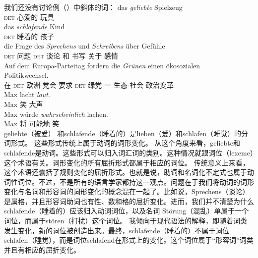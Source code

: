 我们还没有讨论例（）中斜体的词：
\eal
\ex 
\gll das \emph{geliebte} Spielzeug\\
	 \textsc{det} 心爱的 玩具\\
\ex 
\gll das \emph{schlafende} Kind\\
	 \textsc{det} 睡着的 孩子\\
\ex 
\gll die Frage des \emph{Sprechens} und \emph{Schreibens} über Gefühle\\
	 \textsc{det} 问题 \textsc{det} 谈论 和 书写 关于 感情\\
\ex 
\gll Auf dem Europa-Parteitag fordern die \emph{Grünen} einen ökosozialen~~~~~~~~~~~~ Politikwechsel.\\
	 在 \textsc{det} 欧洲-党会 要求 \textsc{det} 绿党 一 生态-社会 政治变革\\
\ex\label{Wortart-adverbiales-Adjektiv} 
\gll Max lacht \emph{laut}.\\
	 Max 笑 大声\\
\ex\label{Wortart-Satzadverb-Adjektiv} 
\gll Max würde \emph{wahrscheinlich} lachen.\\
     Max  将 可能地 笑\\
\zl
geliebte（被爱） 和schlafende（睡着的）是lieben（爱）和schlafen（睡觉）的分词形式。
这些形式传统上属于动词的词形变化。
从这个角度来看，geliebte和schlafende是动词。这些形式可以归入词汇词的类别。这种情况就跟词位（lexeme）这个术语有关。词形变化的所有屈折形式都属于相应的词位。
传统意义上来看，这个术语还囊括了规则变化的屈折形式。也就是说，助词和名词化不定式也属于动词性词位。不过，不是所有的语言学家都持这一观点。问题在于我们将动词的词形变化与名词和形容词的词形变化的概念混在一起了。比如说，Sprechens（谈论）是属格，并且形容词助词也有性、数和格的屈折变化。进而，我们并不清楚为什么schlafende（睡着的）应该归入动词词位，以及名词 Störung（混乱）单属于一个词位，而属于stören（打扰）这个词位。
我倾向于现代语法的解释，即随着词类发生变化，新的词位被创造出来。最终，schlafende（睡着的）不属于词位 schlafen（睡觉），而是词位schlafend在形式上的变化。这个词位属于“形容词”词类并且有相应的屈折变化。
